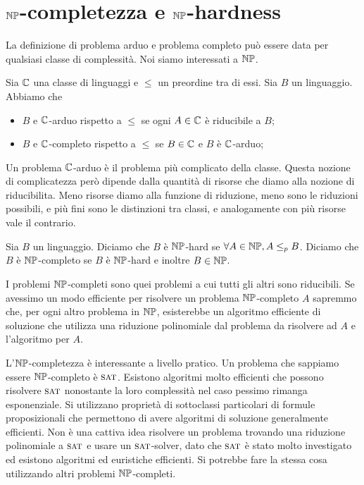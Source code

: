 
\section{$\mathbb{NP}$-completezza e $\mathbb{NP}$-hardness}

La definizione di problema arduo e problema completo può essere data per qualsiasi classe di
complessità. Noi siamo interessati a $\mathbb{NP}$.

\begin{defn}
    Sia $\mathbb{C}$ una classe di linguaggi e $\leq$ un preordine tra di essi. Sia $B$ un linguaggio.
    Abbiamo che
    \begin{itemize}
        \item $B$ e $\mathbb{C}$-arduo rispetto a $\leq$ se ogni $A \in \mathbb{C}$ è riducibile a $B$;
        \item $B$ e $\mathbb{C}$-completo rispetto a $\leq$ se $B \in \mathbb{C}$ e $B$ è $\mathbb{C}$-arduo;
    \end{itemize}
\end{defn}

Un problema $\mathbb{C}$-arduo è il problema più complicato della classe. Questa nozione di
complicatezza però dipende dalla quantità di risorse che diamo alla nozione di riducibilita.  Meno
risorse diamo alla funzione di riduzione, meno sono le riduzioni possibili, e più fini sono le
distinzioni tra classi, e analogamente con più risorse vale il contrario.

\begin{defn}
    Sia $B$ un linguaggio. Diciamo che $B$ è $\mathbb{NP}$-hard se $\forall A \in \mathbb{NP}, A \leq_{p}
    B$. Diciamo che $B$ è $\mathbb{NP}$-completo se $B$ è $\mathbb{NP}$-hard e inoltre $B \in \mathbb{NP}$.
\end{defn}

I problemi $\mathbb{NP}$-completi sono quei problemi a cui tutti gli altri sono riducibili. Se avessimo
un modo efficiente per risolvere un problema $\mathbb{NP}$-completo $A$ sapremmo che, per ogni altro
problema in $\mathbb{NP}$, esisterebbe un algoritmo efficiente di soluzione che utilizza una riduzione
polinomiale dal problema da risolvere ad $A$ e l'algoritmo per $A$.

L'$\mathbb{NP}$-completezza è interessante a livello pratico. Un problema che sappiamo essere
$\mathbb{NP}$-completo è $\textsc{sat}$. Esistono algoritmi molto efficienti che possono risolvere $\textsc{sat}$
nonostante la loro complessità nel caso pessimo rimanga esponenziale. Si utilizzano proprietà di
sottoclassi particolari di formule proposizionali che permettono di avere algoritmi di soluzione
generalmente efficienti. Non è una cattiva idea risolvere un problema trovando una riduzione
polinomiale a $\textsc{sat}$ e usare un $\textsc{sat}$-solver, dato che $\textsc{sat}$ è stato molto investigato ed esistono
algoritmi ed euristiche efficienti. Si potrebbe fare la stessa cosa utilizzando altri problemi
$\mathbb{NP}$-completi.

